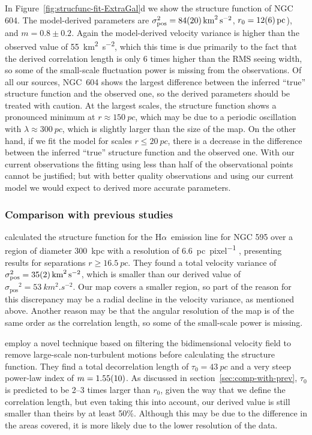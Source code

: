 \documentclass[fleqn,usenatbib, useAMS, a4paper]{mnras}
\newcommand\startNEW{\color{black}}
\newcommand\stopNEW{\color{black}}
\newcommand\pos{\ensuremath{_{\mathrm{pos}}}}
\newcommand\halpha{H${\alpha}$}
\begin{document}
In  Figure~\ref{fig:strucfunc-fit-ExtraGal}d we show the structure function of NGC 604.
\startNEW
The model-derived parameters are \(\sigma\pos^2 = \SI{84 \pm 20}{km^{2}.s^{-2}}\),
\(r_0 = \SI{12 \pm 6}{pc} \)), and \(m = 0.8 \pm 0.2\).
Again the model-derived velocity variance is higher than the observed value of \SI{55}{km^{2}.s^{-2}},
which this time is due primarily to the fact that the
derived correlation length is only 6 times higher than the RMS seeing width,
so some of the small-scale fluctuation power is missing from the observations.
Of all our sources, NGC~604 shows the largest difference between the inferred
``true'' structure function and the observed one, so the derived parameters
should be treated with caution.
At the largest scales, the structure function shows a pronounced minimum
at \(r \approx \SI{150}{pc}\), which may be due to a periodic oscillation with \(\lambda \approx \SI{300}{pc}\),
which is slightly larger than the size of the map. 
On the other hand, if we fit the model for scales \(r \leq \SI{20}{pc}\), there is a decrease in the difference between the inferred ``true'' structure function and the observed one. With our current observations the fitting using less than half of the observational points cannot be justified; but with better quality observations and using our current model we would expect to derived more accurate parameters.
\stopNEW

\startNEW
\subsubsection{Comparison with previous studies}
\label{sec:comparison-m33}

\citet{lagrois2011} calculated the structure function for the \halpha\ emission line for NGC 595
over a region of diameter \SI{300}{kpc} with a resolution of \SI{6.6}{pc.pixel^{-1}} \citep{lagrois2009multi}, presenting results for separations \(r \ge \SI{16.5}{pc}\).
They found a total velocity variance of \(\sigma\pos^2 = \SI{35 \pm 2}{km^{2}.s^{-2}}\), which is smaller than our derived value of \(\sigma\pos^2 = \SI{53}{km^{2}.s^{-2}}\).
Our map covers a smaller region, so part of the reason for this discrepancy may be
a radial decline in the velocity variance, as mentioned above.
Another reason may be that the angular resolution of the \citet{lagrois2009multi} map
is of the same order as the correlation length, so some of the small-scale power is missing.

\citet{lagrois2011} employ a novel technique based on filtering the
bidimensional velocity field to remove large-scale non-turbulent motions
before calculating the structure function.
They find a total decorrelation length of \(\tau_0 = \SI{43}{pc}\) and a very steep
power-law index of \(m = \num{1.55 \pm 0.1}\).
As discussed in section~\ref{sec:comp-with-prev}, \(\tau_0\) is predicted to be 2--3 times larger than \(r_0\), given the way that we define the correlation length,
but even taking this into account, our derived value is still smaller than theirs
by at least 50\%.
Although this may be due to the difference in the areas covered,
it is more likely due to the lower resolution of the \citeauthor{lagrois2011} data.
\end{document}
